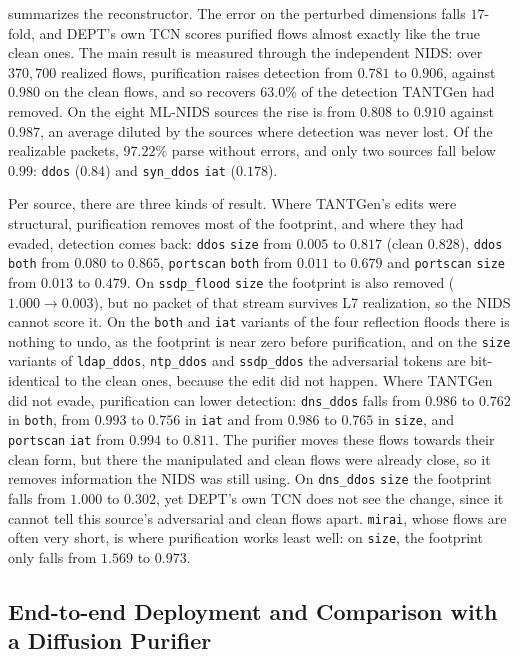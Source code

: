 \documentclass[acmtog,nonacm,pbalance]{acmart}
\newcommand{\src}[1]{\texttt{#1}}
\newcommand{\dmode}[1]{\texttt{#1}}
\begin{document}
 summarizes the reconstructor. The error on the perturbed
dimensions falls $17$-fold, and DEPT's own TCN scores purified flows almost
exactly like the true clean ones. The main result is measured through the
independent NIDS: over $370{,}700$ realized flows, purification raises
detection from $0.781$ to $0.906$, against $0.980$ on the clean flows, and so
recovers $63.0\%$ of the detection TANTGen had removed. On the eight ML-NIDS
sources the rise is from $0.808$ to $0.910$ against $0.987$, an average diluted
by the sources where detection was never lost. Of the realizable packets, $97.22\%$
parse without errors, and only two sources fall below $0.99$: \src{ddos} ($0.84$)
and \src{syn\_ddos} \dmode{iat} ($0.178$).

Per source, there are three kinds of result. Where TANTGen's edits were
structural, purification removes most of the footprint, and where they had
evaded, detection comes back: \src{ddos} \dmode{size} from $0.005$ to $0.817$
(clean $0.828$), \src{ddos} \dmode{both} from $0.080$ to $0.865$, \src{portscan}
\dmode{both} from $0.011$ to $0.679$ and \src{portscan} \dmode{size} from $0.013$
to $0.479$. On \src{ssdp\_flood} \dmode{size} the footprint is also removed
($1.000\rightarrow0.003$), but no packet of that stream survives L7 realization,
so the NIDS cannot score it. On the \dmode{both} and \dmode{iat} variants of the
four reflection floods there is nothing to undo, as the footprint is near zero
before purification, and on the \dmode{size} variants of \src{ldap\_ddos},
\src{ntp\_ddos} and \src{ssdp\_ddos} the adversarial tokens are bit-identical to
the clean ones, because the edit did not happen. Where TANTGen did not evade,
purification can lower detection: \src{dns\_ddos} falls from $0.986$ to $0.762$
in \dmode{both}, from $0.993$ to $0.756$ in \dmode{iat} and from $0.986$ to
$0.765$ in \dmode{size}, and \src{portscan} \dmode{iat} from $0.994$ to $0.811$.
The purifier moves these flows towards their clean form, but there the
manipulated and clean flows were already close, so it removes information the
NIDS was still using. On \src{dns\_ddos} \dmode{size} the footprint falls from
$1.000$ to $0.302$, yet DEPT's own TCN does not see the change, since it cannot
tell this source's adversarial and clean flows apart. \src{mirai}, whose flows
are often very short, is where purification works least well: on \dmode{size},
the footprint only falls from $1.569$ to $0.973$.

\subsection{End-to-end Deployment and Comparison with a Diffusion Purifier}\label{sec:eval-e2e}
\end{document}
